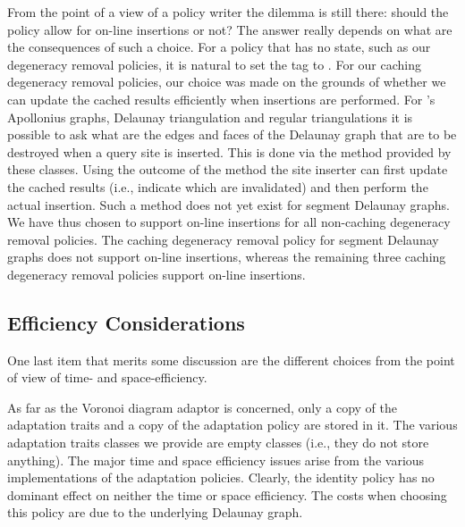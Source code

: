 From the point of a view of a policy writer the dilemma is still
there: should the policy allow for on-line insertions or not? The
answer really depends on what are the consequences of such a
choice. For a policy that has no state, such as our degeneracy removal
policies, it is natural to set the  tag to
. For our caching degeneracy removal policies, our
choice was made on the grounds of whether we can update the cached
results efficiently when insertions are performed. For \cgal's
Apollonius graphs, Delaunay triangulation and regular triangulations
it is possible to ask what are the edges and faces of the Delaunay
graph that are to be destroyed when a query site is inserted. This is
done via the  method provided by these
classes. Using the outcome of the  method the site
inserter can first update the cached results (i.e., indicate which are
invalidated) and then perform the actual insertion. Such a method does
not yet exist for segment Delaunay graphs. We have thus chosen to
support on-line insertions for all non-caching degeneracy removal
policies. The caching degeneracy removal policy for segment Delaunay
graphs does not support on-line insertions, whereas the remaining
three caching degeneracy removal policies support on-line insertions.




\subsection{Efficiency Considerations\label{subsec:vda2-efficiency}}

One last item that merits some discussion are the different choices
from the point of view of time- and space-efficiency.

As far as the Voronoi diagram adaptor is concerned, only a copy of the
adaptation traits and a copy of the adaptation policy are stored in it.
The various adaptation traits classes we provide are empty
classes (i.e., they do not store anything). The major time and space
efficiency issues arise from the various implementations of the
adaptation policies.
%
Clearly, the identity policy has no dominant effect on neither the
time or space efficiency. The costs when choosing this policy are due
to the underlying Delaunay graph.

